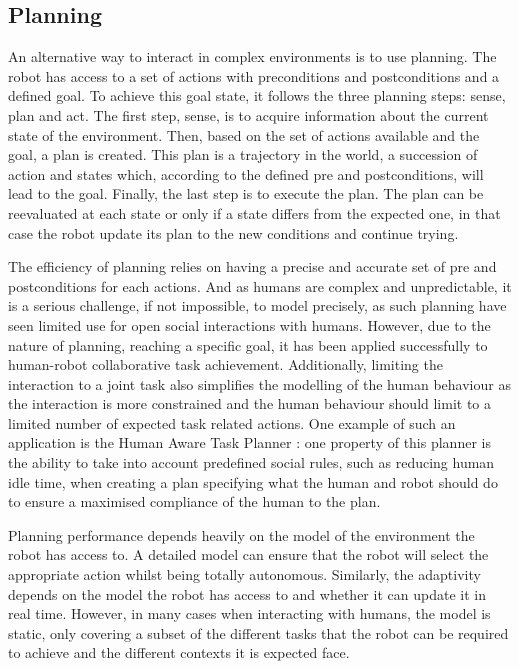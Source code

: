 \subsection{Planning} \label{ssec:planning}
    
    An alternative way to interact in complex environments is to use planning. The robot has access to a set of actions with preconditions and postconditions and a defined goal. To achieve this goal state, it follows the three planning steps: sense, plan and act. The first step, sense, is to acquire information about the current state of the environment. Then, based on the set of actions available and the goal, a plan is created. This plan is a trajectory in the world, a succession of action and states which, according to the defined pre and postconditions, will lead to the goal. Finally, the last step is to execute the plan. The plan can be reevaluated at each state or only if a state differs from the expected one, in that case the robot update its plan to the new conditions and continue trying.
    
    
    The efficiency of planning relies on having a precise and accurate set of pre and postconditions for each actions. And as humans are complex and unpredictable, it is a serious challenge, if not impossible, to model precisely, as such planning have seen limited use for open social interactions with humans. However, due to the nature of planning, reaching a specific goal, it has been applied successfully to human-robot collaborative task achievement. Additionally, limiting the interaction to a joint task also simplifies the modelling of the human behaviour as the interaction is more constrained and the human behaviour should limit to a limited number of expected task related actions. One example of such an application is the Human Aware Task Planner \citep{alili2009task}: one property of this planner is the ability to take into account predefined social rules, such as reducing human idle time, when creating a plan specifying what the human and robot should do to ensure a maximised compliance of the human to the plan.
    
    Planning performance depends heavily on the model of the environment the robot has access to. A detailed model can ensure that the robot will select the appropriate action whilst being totally autonomous. Similarly, the adaptivity depends on the model the robot has access to and whether it can update it in real time. However, in many cases when interacting with humans, the model is static, only covering a subset of the different tasks that the robot can be required to achieve and the different contexts it is expected face.
    
